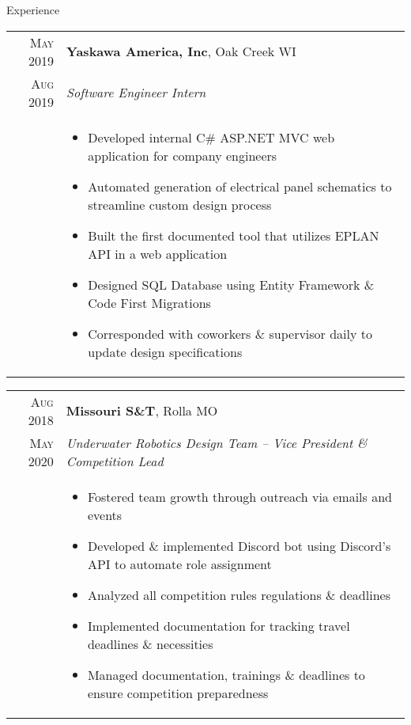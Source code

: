 \documentclass{resume}
\begin{document}
\begin{rSection}{Experience}
{  \begin{tabular}{r|p{15cm}}
    \textsc{May 2019} & \textbf{Yaskawa America, Inc}, Oak Creek WI \\
    \textsc{Aug 2019}  & \textit{Software Engineer Intern} \\ &
    \begin{itemize}
        \item {Developed internal C\# ASP.NET MVC web application for company engineers}
        \item {Automated generation of electrical panel schematics to streamline custom design process}
        \item {Built the first documented tool that utilizes EPLAN API in a web application}
        \item {Designed SQL Database using Entity Framework \& Code First Migrations}
        \item {Corresponded with coworkers \& supervisor daily to update design specifications}
    \end{itemize}
  \end{tabular}

  \begin{tabular}{r|p{15cm}}
    \textsc{Aug 2018} & \textbf{Missouri S\&T}, Rolla MO \\
    \textsc{May 2020}  & \textit{Underwater Robotics Design Team – Vice President \& Competition Lead} \\ &
    \begin{itemize}
      \item {Fostered team growth through outreach via emails and events }
      \item {Developed \& implemented Discord bot using Discord's API to automate role assignment}
      \item {Analyzed all competition rules regulations \& deadlines}
      \item {Implemented documentation for tracking travel deadlines \& necessities}
      \item {Managed documentation, trainings \& deadlines to ensure competition preparedness}
    \end{itemize}
  \end{tabular}
}
\end{rSection}
\end{document}
